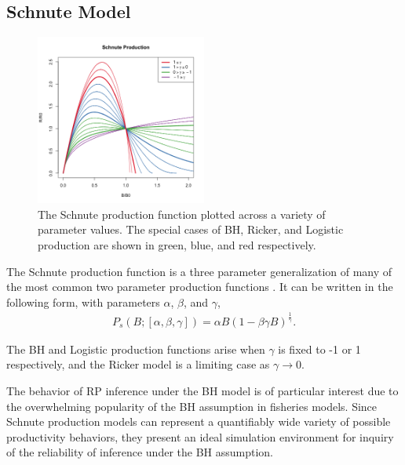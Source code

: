 \documentclass[12pt]{article}
\begin{document}
%
\subsection{Schnute Model}

%
\begin{figure}
\vspace{-2cm}
\includegraphics[width=0.5\textwidth]{../gpBias/g3.png}
\vspace{-1cm}
\caption{
The Schnute production function plotted across a variety of parameter
values. The special cases of BH, Ricker, and Logistic production are shown in
green, blue, and red respectively.
}
\label{sRegimes}
\end{figure}
The Schnute production function is a three parameter generalization of many of 
the most common two parameter production functions . %
It can be written in the following form, with parameters $\alpha$, $\beta$, and $\gamma$,
%
\begin{align}
P_s(B; [\alpha, \beta, \gamma]) = \alpha B (1-\beta\gamma B)^{\frac{1}{\gamma}}.
\end{align}

%
The BH and Logistic production functions arise when $\gamma$ is fixed to -1 or 
1 respectively, and the Ricker model is a limiting case as $\gamma\rightarrow0$. %

%
The behavior of RP inference under the BH model is of particular interest due 
to the overwhelming popularity of the BH assumption in fisheries models.
Since Schnute production models can represent a quantifiably wide variety 
of possible productivity behaviors, they present an ideal simulation 
environment for inquiry of the reliability of inference under the BH 
assumption.
\end{document}
